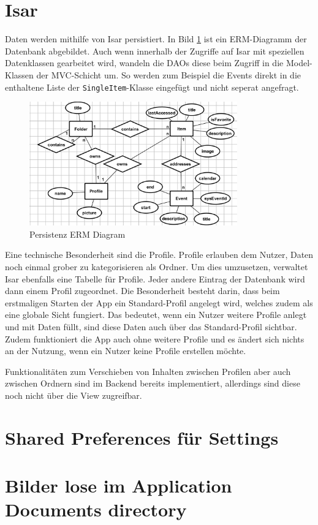 \section{Isar}

Daten werden mithilfe von Isar persistiert. In Bild \ref{img:erm} ist ein ERM-Diagramm der Datenbank abgebildet.
Auch wenn innerhalb der Zugriffe auf Isar mit speziellen Datenklassen gearbeitet wird, wandeln die DAOs diese beim Zugriff in die
Model-Klassen der MVC-Schicht um. So werden zum Beispiel die Events direkt in die enthaltene Liste der \verb|SingleItem|-Klasse eingefügt und nicht seperat angefragt.

\begin{figure}[H]
  \centering
  \includegraphics[width=0.8\textwidth]{figures/persistenz_erm.png}
  \caption{Persistenz ERM Diagram}
  \label{img:erm}
\end{figure}

Eine technische Besonderheit sind die Profile. Profile erlauben dem Nutzer, Daten noch einmal grober zu kategorisieren als Ordner.
Um dies umzusetzen, verwaltet Isar ebenfalls eine Tabelle für Profile. Jeder andere Eintrag der Datenbank wird dann einem Profil zugeordnet.
Die Besonderheit besteht darin, dass beim erstmaligen Starten der App ein Standard-Profil angelegt wird, welches zudem als eine globale Sicht fungiert.
Das bedeutet, wenn ein Nutzer weitere Profile anlegt und mit Daten füllt, sind diese Daten auch über das Standard-Profil sichtbar.
Zudem funktioniert die App auch ohne weitere Profile und es ändert sich nichts an der Nutzung, wenn ein Nutzer keine Profile erstellen möchte.

Funktionalitäten zum Verschieben von Inhalten zwischen Profilen aber auch zwischen Ordnern sind im Backend bereits implementiert, allerdings sind diese noch
nicht über die View zugreifbar.

\section{Shared Preferences für Settings}


\section{Bilder lose im Application Documents directory}